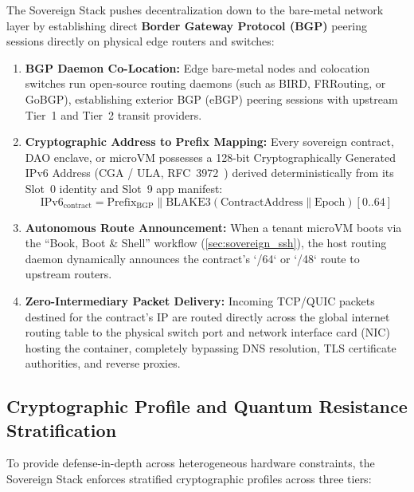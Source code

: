 \documentclass[a4paper,11pt,twoside,parskip=half-,headings=small]{scrartcl}
\begin{document}
The Sovereign Stack pushes decentralization down to the bare-metal network layer by establishing direct \textbf{Border Gateway Protocol (BGP)} peering sessions directly on physical edge routers and switches:
\begin{enumerate}
  \item \textbf{BGP Daemon Co-Location:} Edge bare-metal nodes and colocation switches run open-source routing daemons (such as BIRD, FRRouting, or GoBGP), establishing exterior BGP (eBGP) peering sessions with upstream Tier~1 and Tier~2 transit providers.
  \item \textbf{Cryptographic Address to Prefix Mapping:} Every sovereign contract, DAO enclave, or microVM possesses a 128-bit Cryptographically Generated IPv6 Address (CGA / ULA, RFC~3972~\cite{rfc3972}) derived deterministically from its Slot~0 identity and Slot~9 app manifest:
  \begin{equation}
    \text{IPv6}_{\text{contract}} = \text{Prefix}_{\text{BGP}} \parallel \text{BLAKE3}(\text{ContractAddress} \parallel \text{Epoch})[0..64]
  \end{equation}
  \item \textbf{Autonomous Route Announcement:} When a tenant microVM boots via the ``Book, Boot \& Shell'' workflow (\cref{sec:sovereign_ssh}), the host routing daemon dynamically announces the contract's `/64` or `/48` route to upstream routers.
  \item \textbf{Zero-Intermediary Packet Delivery:} Incoming TCP/QUIC packets destined for the contract's IP are routed directly across the global internet routing table to the physical switch port and network interface card (NIC) hosting the container, completely bypassing DNS resolution, TLS certificate authorities, and reverse proxies.
\end{enumerate}

\subsection{Cryptographic Profile and Quantum Resistance Stratification}
\label{sec:crypto_stratification}

To provide defense-in-depth across heterogeneous hardware constraints, the
Sovereign Stack enforces stratified cryptographic profiles across three tiers:
\end{document}
